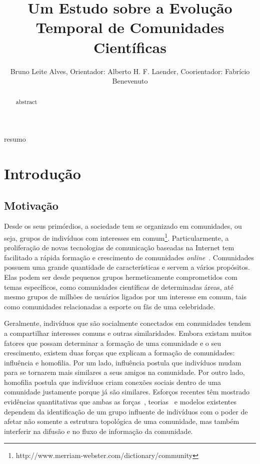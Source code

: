 \documentclass[12pt]{article}
\title{Um Estudo sobre a Evolução Temporal de Comunidades Científicas}
\author{Bruno Leite Alves\inst{1}, Orientador: Alberto H. F. Laender\inst{1}, Coorientador: 
	  Fabrício Benevenuto\inst{1} }
\begin{document}
 

\maketitle

\begin{abstract}
  abstract
\end{abstract}
     
\begin{resumo} 
resumo
\end{resumo}


\section{Introdução}

\subsection{Motivação}

Desde os seus primórdios, a sociedade tem se organizado em comunidades, ou seja, grupos de indivíduos 
com interesses em comum\footnote{http://www.merriam-webster.com/dictionary/community}. Particularmente, 
a proliferação de novas tecnologias de comunicação baseadas na Internet tem facilitado a rápida 
formação e crescimento de comunidades \textit{online}~\cite{Kleinberg2008}. Comunidades possuem uma grande 
quantidade de características e servem a vários propósitos. Elas podem ser desde pequenos 
grupos hermeticamente comprometidos com temas específicos, como comunidades científicas de determinadas áreas, 
até mesmo grupos de milhões de usuários ligados por um interesse em comum, tais como comunidades 
relacionadas a esporte ou fãs de uma celebridade.

Geralmente, indivíduos que são socialmente conectados em comunidades tendem a compartilhar interesses comuns
e outras similaridades. Embora existam muitos fatores que possam determinar a formação de uma comunidade
e o seu crescimento, existem duas forças que explicam a formação de comunidades: influência 
e homofilia. Por um lado, influência postula que indivíduos mudam para se tornarem mais similares
a seus amigos na comunidade. Por outro lado, homofilia postula que indivíduos criam conexões 
sociais dentro de uma comunidade justamente porque já são similares. Esforços recentes 
têm mostrado evidências quantitativas que ambas as forças~\cite{Cha2010,Backstrom2006},
teorias~\cite{Rogers1962,Watts2007} e modelos existentes~\cite{Kempe2003,Kempe2005} 
dependem da identificação de um grupo influente 
de indivíduos com o poder de afetar não somente a estrutura topológica de uma comunidade, 
mas também interferir na difusão e no fluxo de informação da comunidade.
\end{document}
